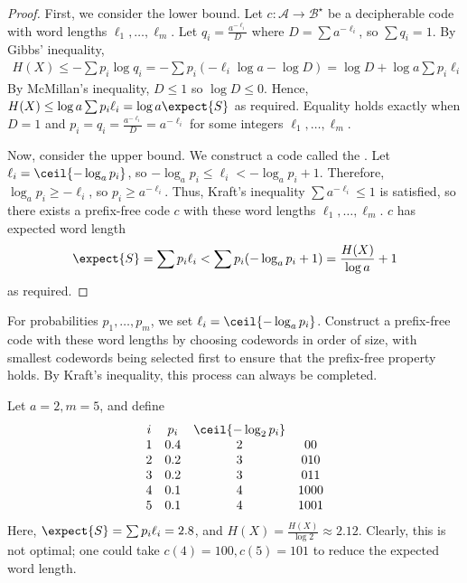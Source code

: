 \begin{proof}
    First, we consider the lower bound.
    Let $c \colon \mathcal A \to \mathcal B^\star$ be a decipherable code with word lengths $\ell_1, \dots, \ell_m$.
    Let $q_i = \frac{a^{-\ell_i}}{D}$ where $D = \sum a^{-\ell_i}$, so $\sum q_i = 1$.
    By Gibbs' inequality,
    \begin{align*}
        H(X) \leq -\sum p_i \log q_i = -\sum p_i(-\ell_i \log a - \log D) = \log D + \log a \sum p_i \ell_i
    \end{align*}
    By McMillan's inequality, $D \leq 1$ so $\log D \leq 0$.
    Hence, $H(X) \leq \log a \sum p_i \ell_i = \log a \expect{S}$ as required.
    Equality holds exactly when $D = 1$ and $p_i = q_i = \frac{a^{-\ell_i}}{D} = a^{-\ell_i}$ for some integers $\ell_1, \dots, \ell_m$.

    Now, consider the upper bound.
    We construct a code called the .
    Let $\ell_i = \ceil{-\log_a p_i}$, so $-\log_a p_i \leq \ell_i < -\log_a p_i + 1$.
    Therefore, $\log_a p_i \geq -\ell_i$, so $p_i \geq a^{-\ell_i}$.
    Thus, Kraft's inequality $\sum a^{-\ell_i} \leq 1$ is satisfied, so there exists a prefix-free code $c$ with these word lengths $\ell_1, \dots, \ell_m$.
    $c$ has expected word length
    \begin{align*}
        \expect{S} = \sum p_i \ell_i < \sum p_i (-\log_a p_i + 1) = \frac{H(X)}{\log a} + 1
    \end{align*}
    as required.
\end{proof}

\begin{example}
    For probabilities $p_1, \dots, p_m$, we set $\ell_i = \ceil{-\log_a p_i}$.
    Construct a prefix-free code with these word lengths by choosing codewords in order of size, with smallest codewords being selected first to ensure that the prefix-free property holds.
    By Kraft's inequality, this process can always be completed.
\end{example}

\begin{example}
    Let $a = 2, m = 5$, and define
    \begin{align*}
        \begin{array}{cccc}
            i & p_i & \ceil{-\log_2 p_i} \\
            1 & 0.4 & 2 & 00 \\
            2 & 0.2 & 3 & 010 \\
            3 & 0.2 & 3 & 011 \\
            4 & 0.1 & 4 & 1000 \\
            5 & 0.1 & 4 & 1001
    \end{array}
    \end{align*}
    Here, $\expect{S} = \sum p_i \ell_i = 2.8$, and $H(X) = \frac{H(X)}{\log 2} \approx 2.12$.
    Clearly, this is not optimal; one could take $c(4) = 100, c(5) = 101$ to reduce the expected word length.
\end{example}

